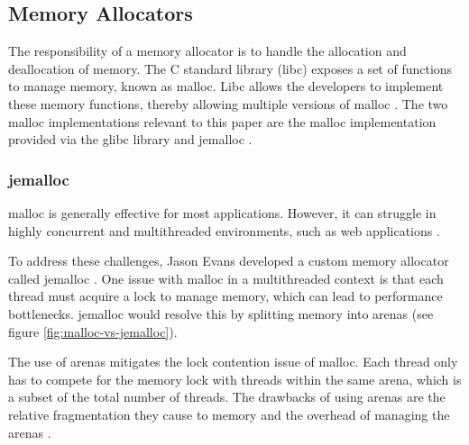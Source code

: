 \documentclass[main.tex]{subfiles}
\begin{document}
 \subsection{Memory Allocators}

The responsibility of a memory allocator is to handle the allocation and deallocation of memory. The C standard library (libc) \cite{c-language-iso9899-2024} exposes a set of functions to manage memory, known as malloc. Libc allows the developers to implement these memory functions, thereby allowing multiple versions of malloc \cite{Berger_Zorn_McKinley}.  The two malloc implementations relevant to this paper are the malloc implementation provided via the glibc library \cite{glibc} and jemalloc \cite{evans2006scalable}.

\subsubsection{jemalloc}
malloc is generally effective for most applications. However, it can struggle in highly concurrent and multithreaded environments, such as web applications \cite{evans2006scalable}. 

To address these challenges, Jason Evans developed a custom memory allocator called jemalloc \cite{evans2006scalable}. One issue with malloc in a multithreaded context is that each thread must acquire a lock to manage memory, which can lead to performance bottlenecks. jemalloc would resolve this by splitting memory into arenas (see figure \ref{fig:malloc-vs-jemalloc}).

The use of arenas mitigates the lock contention issue of malloc. Each thread only has to compete for the memory lock with threads within the same arena, which is a subset of the total number of threads. The drawbacks of using arenas are the relative fragmentation they cause to memory and the overhead of managing the arenas \cite{evans2006scalable}.
\end{document}

